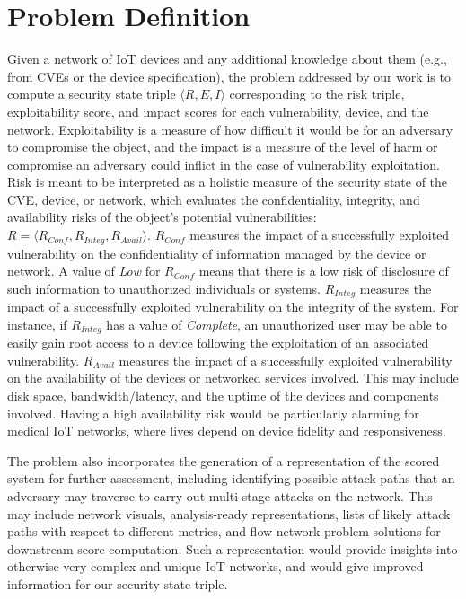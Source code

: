 \section{Problem Definition}
\label{sec:problem_definition}

Given a network of IoT devices and any additional knowledge about them (e.g., from CVEs or the device specification), the problem addressed by our work is to compute a security state triple $\langle R, E, I \rangle$ corresponding to the risk triple, exploitability score, and impact scores for each vulnerability, device, and the network. Exploitability is a measure of how difficult it would be for an adversary to compromise the object, and the impact is a measure of the level of harm or compromise an adversary could inflict in the case of vulnerability exploitation. Risk is meant to be interpreted as a holistic measure of the security state of the CVE, device, or network, which evaluates the confidentiality, integrity, and availability risks of the object's potential vulnerabilities: $R = \langle R_{Conf}, R_{Integ}, R_{Avail} \rangle$. $R_{Conf}$ measures the impact of a successfully exploited vulnerability on the confidentiality of information managed by the device or network. A value of \textit{Low} for $R_{Conf}$ means that there is a low risk of disclosure of such information to unauthorized individuals or systems. $R_{Integ}$ measures the impact of a successfully exploited vulnerability on the integrity of the system. For instance, if $R_{Integ}$ has a value of \textit{Complete}, an unauthorized user may be able to easily gain root access to a device following the exploitation of an associated vulnerability. $R_{Avail}$ measures the impact of a successfully exploited vulnerability on the availability of the devices or networked services involved. This may include disk space, bandwidth/latency, and the uptime of the devices and components involved. Having a high availability risk would be particularly alarming for medical IoT networks, where lives depend on device fidelity and responsiveness.

The problem also incorporates the generation of a representation of the scored system for further assessment, including identifying possible attack paths that an adversary may traverse to carry out multi-stage attacks on the network. This may include network visuals, analysis-ready representations, lists of likely attack paths with respect to different metrics, and flow network problem solutions for downstream score computation. Such a representation would provide insights into otherwise very complex and unique IoT networks, and would give improved information for our security state triple.

